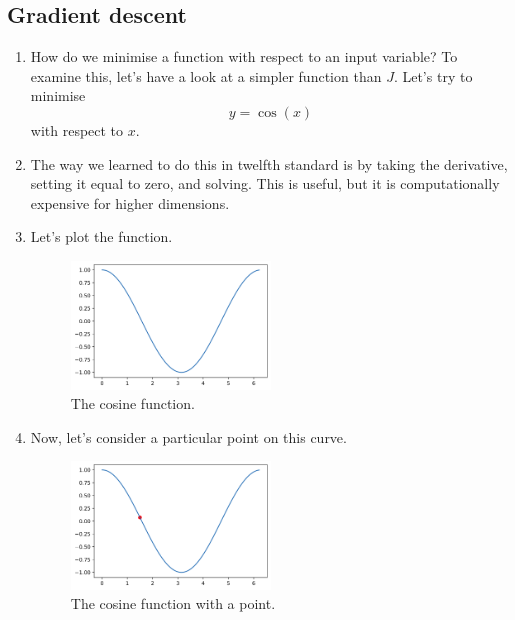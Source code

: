 \documentclass{article}
\begin{document}
        \subsection{Gradient descent}
            \begin{enumerate}
                \item How do we minimise a function with respect to an input variable? To examine this, let's
                have a look at a simpler function than $J$. Let's try to minimise 
                \[
                  y = \cos (x)  
                \]
                with respect to $x$.
                \item The way we learned to do this in twelfth standard is by taking the derivative, setting it equal 
                to zero, and solving. This is useful, but it is computationally expensive for higher dimensions.
                \item Let's plot the function.
                \begin{figure}[h] \begin{center}
                    \includegraphics[width = 0.5\textwidth]{plot3.png}
                    \caption{The cosine function.}
                \end{center} \end{figure}
                \item Now, let's consider a particular point on this curve.
                \begin{figure}[H] \begin{center}
                    \includegraphics[width = 0.5\textwidth]{plot4.png}
                    \caption{The cosine function with a point.}

\end{center}
\end{figure}
\end{enumerate}
\end{document}
